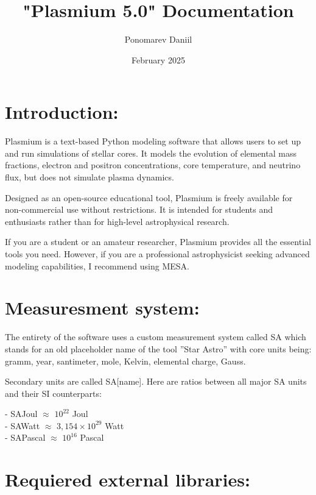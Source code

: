 \documentclass[a4paper,12pt]{article}
\title{"Plasmium 5.0" Documentation}
\author{Ponomarev Daniil}
\date{February 2025}
\begin{document}
\maketitle

\tableofcontents{}

\section{Introduction:}

Plasmium is a text-based Python modeling software that allows users to set up and run simulations of stellar cores. It models the evolution of elemental mass fractions, electron and positron concentrations, core temperature, and neutrino flux, but does not simulate plasma dynamics.

Designed as an open-source educational tool, Plasmium is freely available for non-commercial use without restrictions. It is intended for students and enthusiasts rather than for high-level astrophysical research.

If you are a student or an amateur researcher, Plasmium provides all the essential tools you need. However, if you are a professional astrophysicist seeking advanced modeling capabilities, I recommend using MESA.

\section{Measuresment system:}

The entirety of the software uses a custom measurement system called SA which stands for an old placeholder name of the tool ''Star Astro'' with core units being: gramm, year, santimeter, mole, Kelvin, elemental charge, Gauss.

Secondary units are called SA[name]. Here are ratios between all major SA units and their SI counterparts:

\vspace{1em}

\noindent - SAJoul $\approx$ $10^{22}$ Joul \\
- SAWatt $\approx$ $3,154 \times 10^{29}$ Watt \\
- SAPascal $\approx$ $10^{16}$ Pascal \\

\section{Requiered external libraries:}
\end{document}
